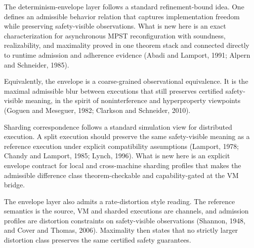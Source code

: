 \documentclass[a4paper,10pt,twocolumn,english]{article}
\numberwithin{equation}{section}
\theoremstyle{paperdef}
\theoremstyle{paperplain}
\theoremstyle{paperdef}
\theoremstyle{paperremark}
\theoremstyle{paperdef}
\begin{document}
The determinism-envelope layer follows a standard refinement-bound idea. One defines an admissible
behavior relation that captures implementation freedom while preserving safety-visible observations.
What is new here is an exact characterization for asynchronous MPST reconfiguration with soundness,
realizability, and maximality proved in one theorem stack and connected directly to runtime admission
and adherence evidence (Abadi and Lamport, 1991; Alpern and Schneider, 1985).

Equivalently, the envelope is a coarse-grained observational equivalence. It is the maximal admissible
blur between executions that still preserves certified safety-visible meaning, in the spirit of
noninterference and hyperproperty viewpoints (Goguen and Meseguer, 1982; Clarkson and Schneider, 2010).

Sharding correspondence follows a standard simulation view for distributed execution. A split execution
should preserve the same safety-visible meaning as a reference execution under explicit compatibility
assumptions (Lamport, 1978; Chandy and Lamport, 1985; Lynch, 1996). What is new here is an explicit
envelope contract for local and cross-machine sharding profiles that makes the admissible difference
class theorem-checkable and capability-gated at the VM bridge.

The envelope layer also admits a rate-distortion style reading. The reference semantics is the source,
VM and sharded executions are channels, and admission profiles are distortion constraints on safety-visible
observations (Shannon, 1948, and Cover and Thomas, 2006). Maximality then states that no strictly larger
distortion class preserves the same certified safety guarantees.
\end{document}
